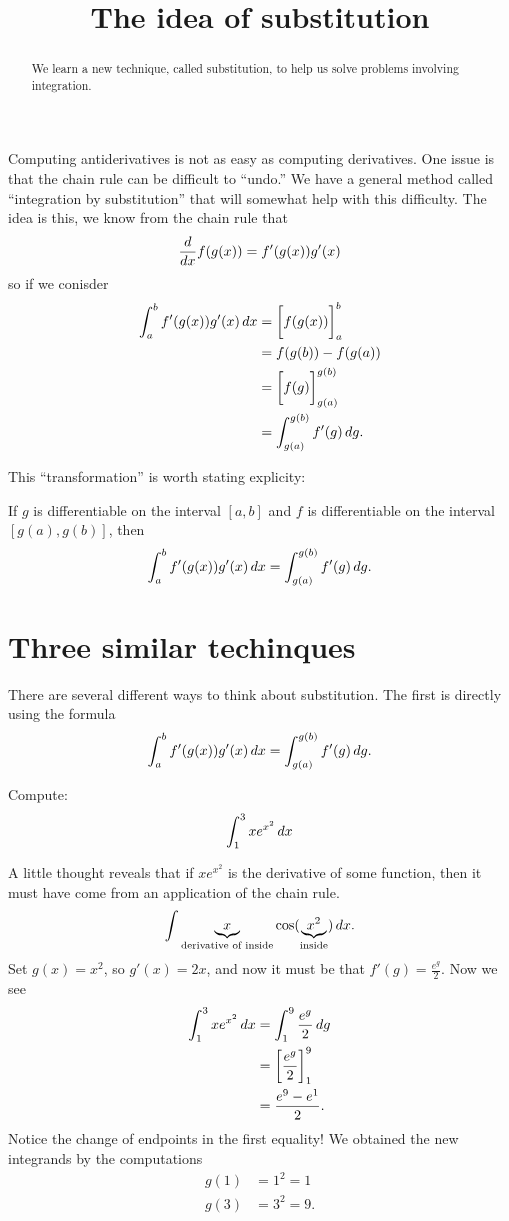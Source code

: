 \documentclass{ximera}
\title[Dig-In:]{The idea of substitution}
\begin{document}
\begin{abstract}
  We learn a new technique, called substitution, to help us solve
  problems involving integration.
\end{abstract}
\maketitle


Computing antiderivatives is not as easy as computing derivatives.
One issue is that the chain rule can be difficult to ``undo.''  We
have a general method called ``integration by substitution'' that will
somewhat help with this difficulty. The idea is this, we know from the
chain rule that
\[
\frac{d}{\mathop{}\!d x} f(g(x)) = f'(g(x))g'(x)
\]
so if we conisder
\begin{align*}
  \int_a^b f'(g(x))g'(x) \mathop{}\!d x &= \bigg[ f(g(x)) \bigg]_a^b \\
  &= f(g(b)) - f(g(a)) \\
  &= \bigg[ f(g) \bigg]_{g(a)}^{g(b)}\\
  &= \int_{g(a)}^{g(b)}f'(g) \mathop{}\!d g.
\end{align*}

This ``transformation'' is worth stating explicity:

\begin{theorem} 
If $g$ is differentiable on the interval $[a,b]$ and $f$ is
differentiable on the interval $[g(a),g(b)]$, then
\[
\int_a^b f'(g(x)) g'(x) \mathop{}\!d x =\int_{g(a)}^{g(b)} f'(g) \mathop{}\!d g.
\]
\end{theorem}

\section{Three similar techinques}

There are several different ways to think about substitution. The
first is directly using the formula
\[
\int_a^b f'(g(x)) g'(x) \mathop{}\!d x = \int_{g(a)}^{g(b)} f'(g) \mathop{}\!d g.
\]
\begin{example}
Compute:
\[
\int_1^3 x e^{x^{2}}\mathop{}\!d x
\]
\begin{explanation}
A little thought reveals that if $x e^{x^{2}}$ is the derivative of
some function, then it must have come from an application of the chain
rule. 
\[
\int \underbrace{x}_{\text{derivative of inside}}\cos(\underbrace{x^2}_{\text{inside}})\mathop{}\!d x.
\]
Set $g(x) = x^2$, so $g'(x) = 2x$, and now it must be that $f'(g) =
\frac{e^{g}}{2}$. Now we see
\begin{align*}
\int_1^3 x e^{x^{2}}\mathop{}\!d x &= \int_1^9 \frac{e^{g}}{2}\mathop{}\!d g\\
&= \bigg[ \frac{e^{g}}{2} \bigg]_1^9 \\
&= \frac{e^{9} -e^{1}}{2}.
\end{align*}
Notice the change of endpoints in the first equality!  
We obtained the new integrands by the computations
\begin{align*}
g(1) &= 1^2 = 1  \\
g(3) &= 3^2 = 9.
\end{align*}
\end{explanation}
\end{example}
\end{document}
